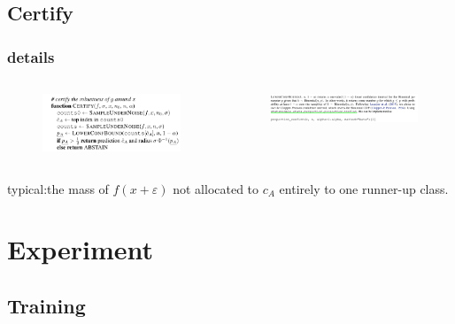 \documentclass[aspectratio=169%
,serif,mathserif]{beamer}
\begin{document}
\subsection{Certify}
\begin{frame}
	\frametitle{details}
	\begin{columns}
		\begin{column}{.4\textwidth}
			\begin{figure}[htbp]
				\includegraphics[width=1\linewidth]{12.png}
			\end{figure}
		\end{column}

		\begin{column}{.6\textwidth}
			\begin{figure}[htbp]
				\includegraphics[width=1\linewidth]{13.png}
			\end{figure}
		\end{column}
	\end{columns}
	typical:the mass of $f(x+\varepsilon)$ not allocated to $c_A$ entirely to one runner-up class.
\end{frame}

\section{Experiment}
\subsection{Training}
\end{document}
